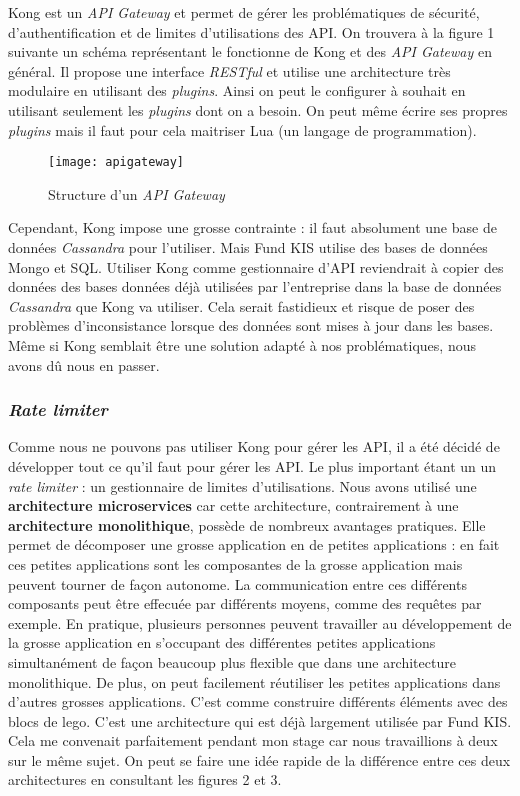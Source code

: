 \vspace{3mm}

Kong est un \textit{API Gateway} et permet de gérer les problématiques de sécurité, d'authentification et de limites d'utilisations des API. On trouvera à la figure 1 suivante un schéma représentant le fonctionne de Kong et des \textit{API Gateway} en général. Il propose une interface \textit{RESTful} et utilise une architecture très modulaire en utilisant des \textit{plugins}. Ainsi on peut le configurer à souhait en utilisant seulement les \textit{plugins} dont on a besoin. On peut même écrire ses propres \textit{plugins} mais il faut pour cela maitriser Lua (un langage de programmation).

\begin{figure}[!h]
\centering
\texttt{[image: apigateway]}
\caption{Structure d'un \textit{API Gateway}}
\end{figure}

\vspace{3mm}

Cependant, Kong impose une grosse contrainte : il faut absolument une base de données \textit{Cassandra} pour l'utiliser. Mais Fund KIS utilise des bases de données Mongo et SQL. Utiliser Kong comme gestionnaire d'API reviendrait à copier des données des bases données déjà utilisées par l'entreprise dans la base de données \textit{Cassandra} que Kong va utiliser. Cela serait fastidieux et risque de poser des problèmes d'inconsistance lorsque des données sont mises à jour dans les bases. Même si Kong semblait être une solution adapté à nos problématiques, nous avons dû nous en passer.



\subsubsection{\textit{Rate limiter}}
Comme nous ne pouvons pas utiliser Kong pour gérer les API, il a été décidé de développer tout ce qu'il faut pour gérer les API. Le plus important étant un un \textit{rate limiter} : un gestionnaire de limites d'utilisations. Nous avons utilisé une \textbf{architecture microservices} car cette architecture, contrairement à une \textbf{architecture monolithique}, possède de nombreux avantages pratiques. Elle permet de décomposer une grosse application en de petites applications : en fait ces petites applications sont les composantes de la grosse application mais peuvent tourner de façon autonome. La communication entre ces différents composants peut être effecuée par différents moyens, comme des requêtes par exemple. En pratique, plusieurs personnes peuvent travailler au développement de la grosse application en s'occupant des différentes petites applications simultanément de façon beaucoup plus flexible que dans une architecture monolithique. De plus, on peut facilement réutiliser les petites applications dans d'autres grosses applications. C'est comme construire différents éléments avec des blocs de lego. C'est une architecture qui est déjà largement utilisée par Fund KIS. Cela me convenait parfaitement pendant mon stage car nous travaillions à deux sur le même sujet. On peut se faire une idée rapide de la différence entre ces deux architectures en consultant les figures 2 et 3.

